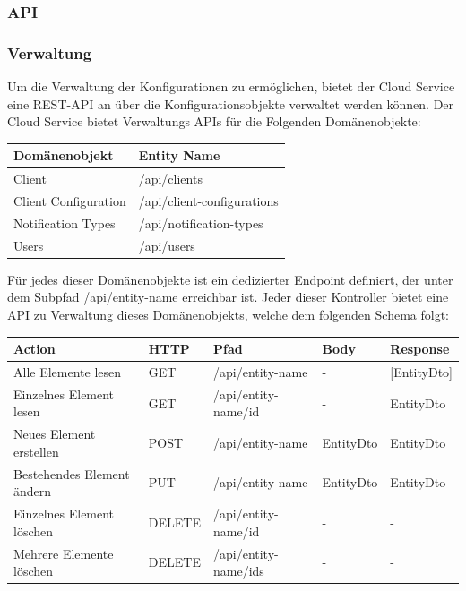 \clearpage

\subsubsection{API}

\subsubsection*{Verwaltung}

Um die Verwaltung der Konfigurationen zu ermöglichen, bietet der Cloud Service eine REST-API an über die Konfigurationsobjekte verwaltet werden können.
Der Cloud Service bietet Verwaltungs APIs für die Folgenden Domänenobjekte:

\begin{table}[h]
    \centering
    \begin{tabular}{|l|p{13cm}|}
        \hline
        \textbf{Domänenobjekt} & \textbf{Entity Name} \\
        \hline
        Client         & /api/clients \\
        \hline
        Client Configuration         & /api/client-configurations \\
        \hline
        Notification Types         & /api/notification-types \\
        \hline
        Users         & /api/users \\
        \hline
    \end{tabular}\label{tab:adminapimethods}
\end{table}

Für jedes dieser Domänenobjekte ist ein dedizierter Endpoint definiert, der unter dem Subpfad /api/entity-name erreichbar ist.
Jeder dieser Kontroller bietet eine API zu Verwaltung dieses Domänenobjekts, welche dem folgenden Schema folgt:

\begin{table}[h]
    \centering
    \begin{tabular}{|l|l|l|l|l|}
        \hline
        \textbf{Action} & \textbf{HTTP} & \textbf{Pfad} & \textbf{Body} & \textbf{Response} \\
        \hline
            Alle Elemente lesen         & GET & /api/entity-name & - & [EntityDto] \\
        \hline
            Einzelnes Element lesen         & GET & /api/entity-name/id & - & EntityDto \\
        \hline
            Neues Element erstellen         & POST & /api/entity-name  & EntityDto & EntityDto\\
        \hline
            Bestehendes Element ändern          & PUT & /api/entity-name  & EntityDto & EntityDto\\
        \hline
            Einzelnes Element löschen          & DELETE & /api/entity-name/id  & - & -  \\
        \hline
            Mehrere Elemente löschen          & DELETE & /api/entity-name/ids  & - & - \\
        \hline
    \end{tabular}\label{tab:apimethods}
\end{table}

